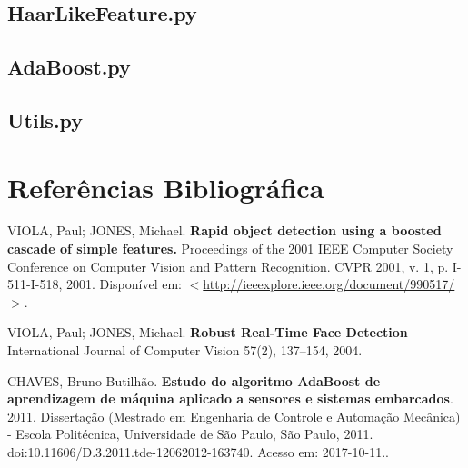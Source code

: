 \documentclass[12pt,a4paper]{article}
\begin{document}
 
 
 \subsection{HaarLikeFeature.py}

 

\subsection{AdaBoost.py}


\subsection{Utils.py}






%


\newpage
\section{Referências Bibliográfica}
\noindent VIOLA, Paul; JONES, Michael. \textbf{Rapid object detection using a boosted cascade of simple features.} Proceedings of the 2001 IEEE Computer Society Conference on Computer Vision and Pattern Recognition. CVPR 2001, v. 1, p. I-511-I-518, 2001. Disponível em: $<$\url{http://ieeexplore.ieee.org/document/990517/}$>$.\\\vspace{0.2cm}

\noindent VIOLA, Paul; JONES, Michael. \textbf{Robust Real-Time Face
Detection}  International Journal of Computer Vision
57(2), 137–154, 2004.\\\vspace{0.2cm}


\noindent CHAVES, Bruno Butilhão. \textbf{Estudo do algoritmo AdaBoost de aprendizagem de máquina aplicado a sensores e sistemas embarcados}. 2011. Dissertação (Mestrado em Engenharia de Controle e Automação Mecânica) - Escola Politécnica, Universidade de São Paulo, São Paulo, 2011. doi:10.11606/D.3.2011.tde-12062012-163740. Acesso em: 2017-10-11..\\\vspace{0.2cm}
\end{document}
